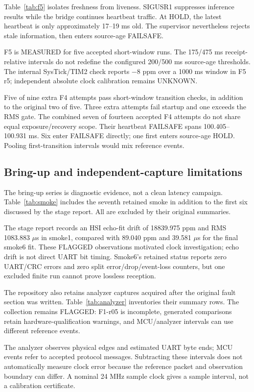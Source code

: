 \documentclass[a4paper,11pt]{article}
\newcommand{\page}{\clearpage}
\begin{document}
Table~\ref{tab:f5} isolates freshness from liveness. SIGUSR1 suppresses inference results while the bridge continues heartbeat traffic. At HOLD, the latest heartbeat is only approximately 17--19 ms old. The supervisor nevertheless rejects stale information, then enters source-age FAILSAFE.

F5 is MEASURED for five accepted short-window runs. The 175/475 ms receipt-relative intervals do not redefine the configured 200/500 ms source-age thresholds. The internal SysTick/TIM2 check reports $-8$ ppm over a 1000 ms window in F5 r5; independent absolute clock calibration remains UNKNOWN.

Five of nine extra F4 attempts pass short-window transition checks, in addition to the original two of five. Three extra attempts fail startup and one exceeds the RMS gate. The combined seven of fourteen accepted F4 attempts do not share equal exposure/recovery scope. Their heartbeat FAILSAFE spans 100.405--100.931 ms. Six enter FAILSAFE directly; one first enters source-age HOLD. Pooling first-transition intervals would mix reference events.
\page
\subsection{Bring-up and independent-capture limitations}
The bring-up series is diagnostic evidence, not a clean latency campaign. Table~\ref{tab:smoke} includes the seventh retained smoke in addition to the first six discussed by the stage report. All are excluded by their original summaries.

The stage report records an HSI echo-fit drift of 18839.975 ppm and RMS 1083.883 $\mu$s in smoke1, compared with 89.040 ppm and 39.581 $\mu$s for the final smoke6 fit. These FLAGGED observations motivated clock investigation; echo drift is not direct UART bit timing. Smoke6's retained status reports zero UART/CRC errors and zero split error/drop/event-loss counters, but one excluded finite run cannot prove lossless reception.

The repository also retains analyzer captures acquired after the original fault section was written. Table~\ref{tab:analyzer} inventories their summary rows. The collection remains FLAGGED: F1-r05 is incomplete, generated comparisons retain hardware-qualification warnings, and MCU/analyzer intervals can use different reference events.

The analyzer observes physical edges and estimated UART byte ends; MCU events refer to accepted protocol messages. Subtracting these intervals does not automatically measure clock error because the reference packet and observation boundary can differ. A nominal 24 MHz sample clock gives a sample interval, not a calibration certificate.
\end{document}
